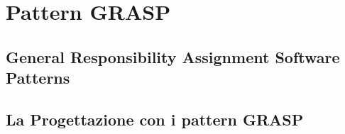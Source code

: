 \chapter{Pattern GRASP}
\label{GRASP}


\section{General Responsibility Assignment Software Patterns}

\section{La Progettazione con i pattern GRASP}